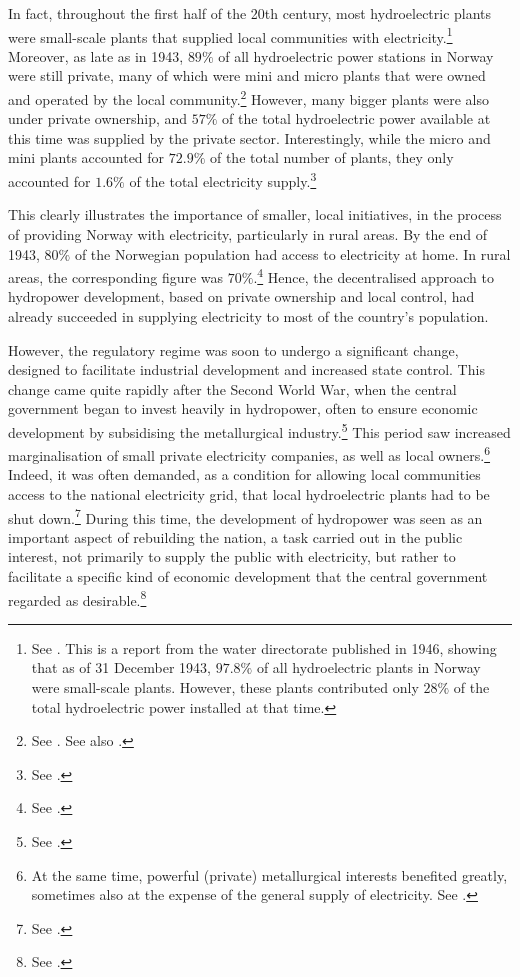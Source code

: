 In fact, throughout the first half of the 20th century, most hydroelectric plants were small-scale plants that supplied local communities with electricity.\footnote{See \cite[11]{utbygd46}. This is a report from the water directorate published in 1946, showing that as of 31 December 1943, $97.8 \%$ of all hydroelectric plants in Norway were small-scale plants. However, these plants contributed only $28 \%$ of the total hydroelectric power installed at that time.} Moreover, as late as in 1943, $89 \%$ of all hydroelectric power stations in Norway were still private, many of which were mini and micro plants that were owned and operated by the local community.\footnote{See \cite[6]{utbygd46}. See also \cite[111]{hindrum94}.} However, many bigger plants were also under private ownership, and $57 \%$ of the total hydroelectric power available at this time was supplied by the private sector. Interestingly,  while the micro and mini plants accounted for $72.9 \%$ of the total number of plants, they only accounted for $1.6 \%$ of the total electricity supply.\footnote{See \cite[7]{utbygd46}.} 

This clearly illustrates the importance of smaller, local initiatives, in the process of providing Norway with electricity, particularly in rural areas. By the end of 1943, $80 \%$ of the Norwegian population had access to electricity at home. In rural areas, the corresponding figure was $70 \%$.\footnote{See \cite[7]{utbygd46}.} Hence, the decentralised approach to hydropower development, based on private ownership and local control, had already succeeded in supplying electricity to most of the country's population.

However, the regulatory regime was soon to undergo a significant change, designed to facilitate industrial development and increased state control. This change came quite rapidly after the Second World War, when the central government began to invest heavily in hydropower, often to ensure economic development by subsidising the metallurgical industry.\footnote{See \cite[59-65]{thue96}.} This period saw increased marginalisation of small private electricity companies, as well as local owners.\footnote{At the same time, powerful (private) metallurgical interests benefited greatly, sometimes also at the expense of the general supply of electricity. See \cite[65-71]{tvedt96}.} Indeed, it was often demanded, as a condition for allowing local communities access to the national electricity grid, that local hydroelectric  plants had to be shut down.\footnote{See \cite[p.111]{hindrum94}.} During this time, the development of hydropower was seen as an important aspect of rebuilding the nation, a task carried out in the public interest, not primarily to supply the public with electricity, but rather to facilitate a specific kind of economic development that the central government regarded as desirable.\footnote{See \cite[59]{thue96}.}

